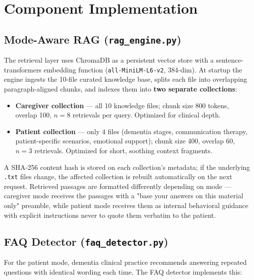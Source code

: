 \documentclass[11pt, a4paper]{article}
\begin{document}
\section{Component Implementation}

\subsection{Mode-Aware RAG (\texttt{rag\_engine.py})}

The retrieval layer uses ChromaDB as a persistent vector store with a sentence-transformers embedding function (\texttt{all-MiniLM-L6-v2}, 384-dim). At startup the engine ingests the 10-file curated knowledge base, splits each file into overlapping paragraph-aligned chunks, and indexes them into \textbf{two separate collections}:

\begin{itemize}
    \item \textbf{Caregiver collection} --- all 10 knowledge files; chunk size 800 tokens, overlap 100, $n=8$ retrievals per query. Optimized for clinical depth.
    \item \textbf{Patient collection} --- only 4 files (dementia stages, communication therapy, patient-specific scenarios, emotional support); chunk size 400, overlap 60, $n=3$ retrievals. Optimized for short, soothing context fragments.
\end{itemize}

A SHA-256 content hash is stored on each collection's metadata; if the underlying \texttt{.txt} files change, the affected collection is rebuilt automatically on the next request. Retrieved passages are formatted differently depending on mode --- caregiver mode receives the passages with a "base your answers on this material only" preamble, while patient mode receives them as internal behavioral guidance with explicit instructions never to quote them verbatim to the patient.

\subsection{FAQ Detector (\texttt{faq\_detector.py})}

For the patient mode, dementia clinical practice recommends answering repeated questions with identical wording each time. The FAQ detector implements this:
\end{document}
